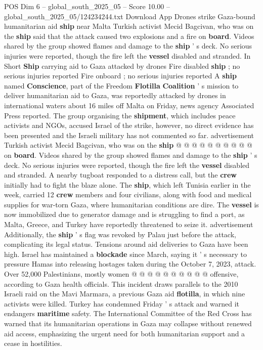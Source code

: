 \begin{textsample}{POS Dim 6 – global\_south\_2025\_05 – Score 10.00 – global\_south\_2025\_05/124234244.txt}  \label{ex:f6_pos_035}
Download App Drones strike Gaza-bound humanitarian aid \textbf{ship} near Malta Turkish activist Mecid Bagcivan, who was on the \textbf{ship} said that the attack caused two explosions and a fire on \textbf{board}.
Videos shared by the group showed flames and damage to the \textbf{ship} ' s deck.
No serious injuries were reported, though the fire left the \textbf{vessel} disabled and stranded.
In Short \textbf{Ship} carrying aid to Gaza attacked by drones Fire disabled \textbf{ship} ; no serious injuries reported Fire onboard ; no serious injuries reported A \textbf{ship} named \textbf{Conscience}, part of the Freedom \textbf{Flotilla} \textbf{Coalition} ' s mission to deliver humanitarian aid to Gaza, was reportedly attacked by drones in international waters about 16 miles off Malta on Friday, news agency Associated Press reported.
The group organising the \textbf{shipment}, which includes peace activists and NGOs, accused Israel of the strike, however, no direct evidence has been presented and the Israeli military has not commented so far. advertisement Turkish activist Mecid Bagcivan, who was on the \textbf{ship} @ @ @ @ @ @ @ @ @ @ on \textbf{board}.
Videos shared by the group showed flames and damage to the \textbf{ship} ' s deck.
No serious injuries were reported, though the fire left the \textbf{vessel} disabled and stranded.
A nearby tugboat responded to a distress call, but the \textbf{crew} initially had to fight the blaze alone.
The \textbf{ship}, which left Tunisia earlier in the week, carried 12 \textbf{crew} members and four civilians, along with food and medical supplies for war-torn Gaza, where humanitarian conditions are dire.
The \textbf{vessel} is now immobilized due to generator damage and is struggling to find a port, as Malta, Greece, and Turkey have reportedly threatened to seize it. advertisement Additionally, the \textbf{ship} ' s flag was revoked by Palau just before the attack, complicating its legal status.
Tensions around aid deliveries to Gaza have been high.
Israel has maintained a \textbf{blockade} since March, saying it ' s necessary to pressure Hamas into releasing hostages taken during the October 7, 2023, attack.
Over 52,000 Palestinians, mostly women @ @ @ @ @ @ @ @ @ @ offensive, according to Gaza health officials.
This incident draws parallels to the 2010 Israeli raid on the Mavi Marmara, a previous Gaza aid \textbf{flotilla}, in which nine activists were killed.
Turkey has condemned Friday ' s attack and warned it endangers \textbf{maritime} safety.
The International Committee of the Red Cross has warned that its humanitarian operations in Gaza may collapse without renewed aid access, emphasizing the urgent need for both humanitarian support and a cease in hostilities.

\end{textsample}
